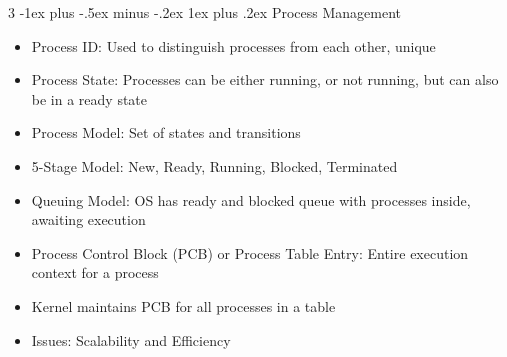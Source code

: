 \documentclass[10pt, landscape]{article}
\makeatletter
\renewcommand{\subsection}{\@startsection{subsection}{3}{0mm}%
                                {-1ex plus -.5ex minus -.2ex}%
                                {1ex plus .2ex}%
                                {\normalfont\small\bfseries}}%
\makeatother
\begin{document}
\begin{multicols*}{3}
\subsection{Process Management}
\begin{itemize}
    \item Process ID: Used to distinguish processes from each other, unique
    \item Process State: Processes can be either running, or not running, but can also be in a ready state
    \item Process Model: Set of states and transitions
    \item 5-Stage Model: New, Ready, Running, Blocked, Terminated
    \item Queuing Model: OS has ready and blocked queue with processes inside, awaiting execution

    \item Process Control Block (PCB) or Process Table Entry: Entire execution context for a process
    \item Kernel maintains PCB for all processes in a table
    \item Issues: Scalability and Efficiency
\end{itemize}


\end{multicols*}
\end{document}
